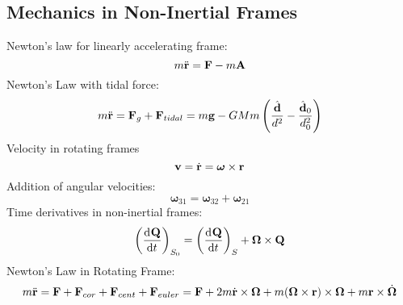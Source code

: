 \subsection{Mechanics in Non-Inertial Frames}
Newton's law for linearly accelerating frame:
\begin{equation}
    m\ddot{\mathbf{r}} = \mathbf{F} - m\mathbf{A}
\end{equation}
Newton's Law with tidal force:
\begin{equation}
    m\ddot{\mathbf{r}} = \mathbf{F}_g + \mathbf{F}_{tidal} = m\mathbf{g} - GMm\left(\frac{\hat{\mathbf{d}}}{d^2} - \frac{\hat{\mathbf{d}}_0}{d_0^2}\right)
\end{equation}
Velocity in rotating frames
\begin{equation}
    \mathbf{v} = \dot{\mathbf{r}} = \bm{\omega} \times \mathbf{r}
\end{equation}
Addition of angular velocities:
\begin{equation}
    \bm{\omega}_{31} = \bm{\omega}_{32} + \bm{\omega}_{21}
\end{equation}
Time derivatives in non-inertial frames:
\begin{equation}
\left(\dod{\v{Q}}{t}\right)_{S_0} = \left(\dod{\v{Q}}{t}\right)_{S} + \bm{\Omega} \times \v{Q}
\end{equation}
Newton's Law in Rotating Frame:
\begin{equation}
    m\ddot{\mathbf{r}} = \mathbf{F} + \mathbf{F}_{cor} + \mathbf{F}_{cent} + \mathbf{F}_{euler} = \mathbf{F} + 2m\dot{\mathbf{r}}\times \bm{\Omega} + m(\bm{\Omega} \times \mathbf{r})\times \bm{\Omega} + m\mathbf{r} \times \dot{\bm{\Omega}}
\end{equation}
